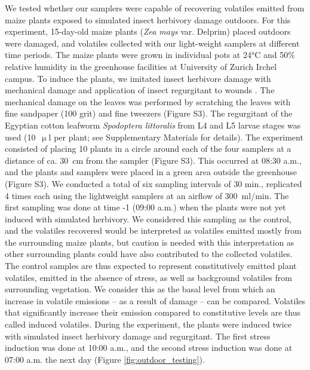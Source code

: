We tested whether our samplers were capable of recovering volatiles emitted from maize plants exposed to simulated insect herbivory damage outdoors. For this experiment, 15-day-old maize plants (\textit{Zea mays} var. Delprim) placed outdoors were damaged, and volatiles collected with our light-weight samplers at different time periods. The maize plants were grown in individual pots at 24°C and 50\% relative humidity in the greenhouse facilities at University of Zurich Irchel campus. To induce the plants, we imitated insect herbivore damage with mechanical damage and application of insect regurgitant to wounds \cite{Waterman2019}. The mechanical damage on the leaves was performed by scratching the leaves with fine sandpaper (100 grit) and fine tweezers (Figure S3). The regurgitant of the Egyptian cotton leafworm \textit{Spodoptera littoralis} from L4 and L5 larvae stages was used (10~$\upmu$l per plant; see Supplementary Materials \cite{Geckeler2023} for details).
The experiment consisted of placing 10 plants in a circle around each of the four samplers at a distance of ca. 30~cm from the sampler (Figure S3). This occurred at 08:30 a.m., and the plants and samplers were placed in a green area outside the greenhouse (Figure S3). We conducted a total of six sampling intervals of 30 min., replicated 4 times each using the lightweight samplers at an airflow of 300~ml/min. The first sampling was done at time -1 (09:00 a.m.) when the plants were not yet induced with simulated herbivory. We considered this sampling as the control, and the volatiles recovered would be interpreted as volatiles emitted mostly from the surrounding maize plants, but caution is needed with this interpretation as other surrounding plants could have also contributed to the collected volatiles. The control samples are thus expected to represent constitutively emitted plant volatiles, emitted in the absence of stress, as well as background volatiles from surrounding vegetation. We consider this as the basal level from which an increase in volatile emissions – as a result of damage – can be compared. Volatiles that significantly increase their emission compared to constitutive levels are thus called induced volatiles. During the experiment, the plants were induced twice with simulated insect herbivory damage and regurgitant. The first stress induction was done at 10:00 a.m., and the second stress induction was done at 07:00 a.m. the next day (Figure \ref{fig:outdoor_testing}).
